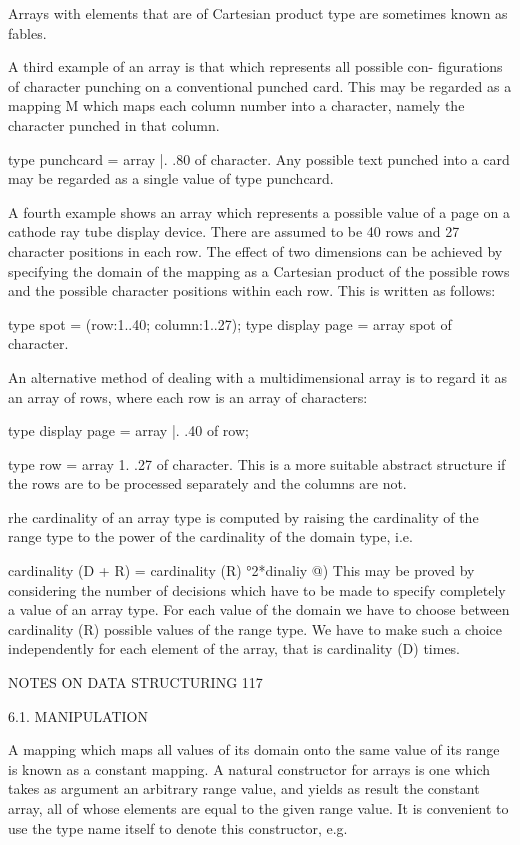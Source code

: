 {{		Arrays with elements that are of Cartesian product type are sometimes known as fables.
		
		A third example of an array is that which represents all possible con- figurations of character punching on a conventional punched card. This may be regarded as a mapping M which maps each column number into a character, namely the character punched in that column.
		
		type punchcard = array |. .80 of character. Any possible text punched into a card may be regarded as a single value of type punchcard.
		
		A fourth example shows an array which represents a possible value of a page on a cathode ray tube display device. There are assumed to be 40 rows and 27 character positions in each row. The effect of two dimensions can be achieved by specifying the domain of the mapping as a Cartesian product of the possible rows and the possible character positions within each row. This is written as follows:
		
		type spot = (row:1..40; column:1..27); type display page = array spot of character.
		
		An alternative method of dealing with a multidimensional array is to regard it as an array of rows, where each row is an array of characters:
		
		type display page = array |. .40 of row;
		
		type row = array 1. .27 of character. This is a more suitable abstract structure if the rows are to be processed separately and the columns are not.
		
		rhe cardinality of an array type is computed by raising the cardinality of the range type to the power of the cardinality of the domain type, i.e.
		
		cardinality (D + R) = cardinality (R) °2*dinaliy @) This may be proved by considering the number of decisions which have to be made to specify completely a value of an array type. For each value of the domain we have to choose between cardinality (R) possible values of the range type. We have to make such a choice independently for each element of the array, that is cardinality (D) times.
		
		NOTES ON DATA STRUCTURING 117
		
		6.1. MANIPULATION
		
		A mapping which maps all values of its domain onto the same value of its range is known as a constant mapping. A natural constructor for arrays is one which takes as argument an arbitrary range value, and yields as result the constant array, all of whose elements are equal to the given range value. It is convenient to use the type name itself to denote this constructor, e.g.
		
}}
